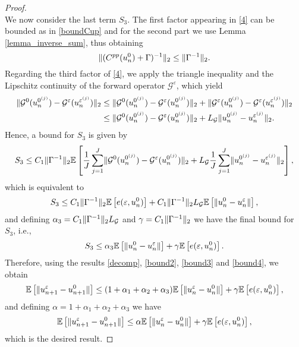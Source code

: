\begin{proof}
\begin{equation}
\end{equation}
We now consider the last term $S_3$. The first factor appearing in \eqref{4} can be bounded as in \eqref{boundCup} and for the second part we use Lemma \ref{lemma_inverse_sum}, thus obtaining
\begin{equation*}
\lVert(C^{pp}(u_n^0) + \Gamma)^{-1}\rVert_2 \le \lVert\Gamma^{-1}\rVert_2.
\end{equation*}
Regarding the third factor of \eqref{4}, we apply the triangle inequality and the Lipschitz continuity of the forward operator $\mathcal{G}^{\varepsilon}$, which yield
\begin{align*}
\lVert\mathcal{G}^0(u_n^{0^{(j)}}) - \mathcal{G}^{\varepsilon}(u_n^{\varepsilon^{(j)}})\rVert_2 \le & \; \lVert\mathcal{G}^0(u_n^{0^{(j)}}) - \mathcal{G}^{\varepsilon}(u_n^{0^{(j)}})\rVert_2 + \lVert\mathcal{G}^{\varepsilon}(u_n^{0^{(j)}}) - \mathcal{G}^{\varepsilon}(u_n^{\varepsilon^{(j)}})\rVert_2 \\
\le & \; \lVert\mathcal{G}^0(u_n^{0^{(j)}}) - \mathcal{G}^{\varepsilon}(u_n^{0^{(j)}})\rVert_2 + L_{\mathcal{G}} \lVert u_n^{0^{(j)}} - u_n^{\varepsilon^{(j)}}\rVert_2.
\end{align*}
Hence, a bound for $S_3$ is given by
\begin{equation*}
S_3 \leq C_1 \lVert\Gamma^{-1}\rVert_2 \mathbb{E} \left [ \frac{1}{J} \sum_{j=1}^J \lVert\mathcal{G}^0(u_n^{0^{(j)}}) - \mathcal{G}^{\varepsilon}(u_n^{0^{(j)}})\rVert_2 + L_{\mathcal{G}} \frac{1}{J} \sum_{j=1}^J \lVert u_n^{0^{(j)}} - u_n^{\varepsilon^{(j)}}\rVert_2 \right ],
\end{equation*}
which is equivalent to
\begin{equation*}
S_3 \leq C_1 \lVert\Gamma^{-1}\rVert_2 \mathbb{E} \left [ e(\varepsilon, u_n^0) \right ] + C_1 \lVert\Gamma^{-1}\rVert_2 L_{\mathcal{G}} \mathbb{E} \left [ \lVert u_n^0 - u_n^{\varepsilon}\rVert \right ],
\end{equation*}
and defining $\alpha_3 = C_1 \lVert\Gamma^{-1}\rVert_2 L_{\mathcal{G}}$ and $\gamma = C_1 \lVert\Gamma^{-1}\rVert_2$ we have the final bound for $S_3$, i.e.,
\begin{equation}
\label{bound4}
S_3 \leq \alpha_3 \mathbb{E} \left [ \lVert u_n^0 - u_n^{\varepsilon}\rVert \right ] + \gamma \mathbb{E} \left [ e(\varepsilon, u_n^0) \right ].
\end{equation}
Therefore, using the results \eqref{decomp}, \eqref{bound2}, \eqref{bound3} and \eqref{bound4}, we obtain
\begin{equation*}
\mathbb{E} \left [ \lVert u_{n+1}^{\varepsilon} - u_{n+1}^0\rVert \right ] \le (1 + \alpha_1 + \alpha_2 + \alpha_3) \mathbb{E} \left [ \lVert u_n^{\varepsilon} - u_n^0\rVert \right ] + \gamma \mathbb{E} \left [ e(\varepsilon, u_n^0) \right ],
\end{equation*}
and defining $\alpha = 1 + \alpha_1 + \alpha_2 + \alpha_3$ we have
\begin{equation}
\label{induction}
\mathbb{E} \left [ \lVert u_{n+1}^{\varepsilon} - u_{n+1}^0\rVert \right ] \le \alpha \mathbb{E} \left [ \lVert u_n^{\varepsilon} - u_n^0\rVert \right ] + \gamma \mathbb{E} \left [ e(\varepsilon, u_n^0) \right ],
\end{equation}
which is the desired result.
\end{proof}

